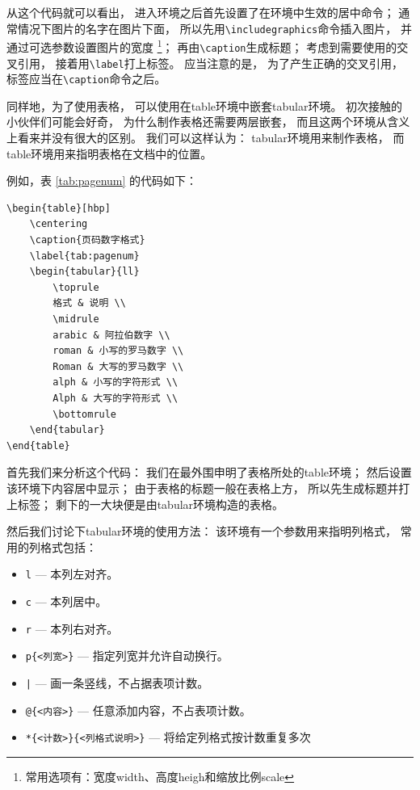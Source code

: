 \documentclass{ctexart}
\numberwithin{equation}{section}			%
\begin{document}
	从这个代码就可以看出，
	进入环境之后首先设置了在环境中生效的居中命令；
	通常情况下图片的名字在图片下面，
	所以先用\verb|\includegraphics|命令插入图片，
	并通过可选参数设置图片的宽度
	\footnote{常用选项有：宽度width、高度heigh和缩放比例scale}；
	再由\verb|\caption|生成标题；
	考虑到需要使用的交叉引用，
	接着用\verb|\label|打上标签。
	应当注意的是，
	为了产生正确的交叉引用，
	标签应当在\verb|\caption|命令之后。
	
	同样地，为了使用表格，
	可以使用在table环境中嵌套tabular环境。
	初次接触的小伙伴们可能会好奇，
	为什么制作表格还需要两层嵌套，
	而且这两个环境从含义上看来并没有很大的区别。
	我们可以这样认为：
	tabular环境用来制作表格，
	而table环境用来指明表格在文档中的位置。

	例如，表 \ref{tab:pagenum} 的代码如下：
	
\begin{lstlisting}
\begin{table}[hbp]
	\centering
	\caption{页码数字格式}
	\label{tab:pagenum}
	\begin{tabular}{ll}
		\toprule
		格式 & 说明 \\
		\midrule
		arabic & 阿拉伯数字 \\
		roman & 小写的罗马数字 \\
		Roman & 大写的罗马数字 \\
		alph & 小写的字符形式 \\
		Alph & 大写的字符形式 \\
		\bottomrule
	\end{tabular}
\end{table}
\end{lstlisting}

	首先我们来分析这个代码：
	我们在最外围申明了表格所处的table环境；
	然后设置该环境下内容居中显示；
	由于表格的标题一般在表格上方，
	所以先生成标题并打上标签；
	剩下的一大块便是由tabular环境构造的表格。
	
	然后我们讨论下tabular环境的使用方法：
	该环境有一个参数用来指明列格式，
	常用的列格式包括：
	
	\begin{itemize}
		\item \verb|l| --- 本列左对齐。
		\item \verb|c| --- 本列居中。
		\item \verb|r| --- 本列右对齐。
		\item \verb|p{<列宽>}| --- 指定列宽并允许自动换行。
		\item \verb=|= --- 画一条竖线，不占据表项计数。
		\item \verb|@{<内容>}| --- 任意添加内容，不占表项计数。
		\item \verb|*{<计数>}{<列格式说明>}| --- 将给定列格式按计数重复多次
	\end{itemize}
\end{document}
